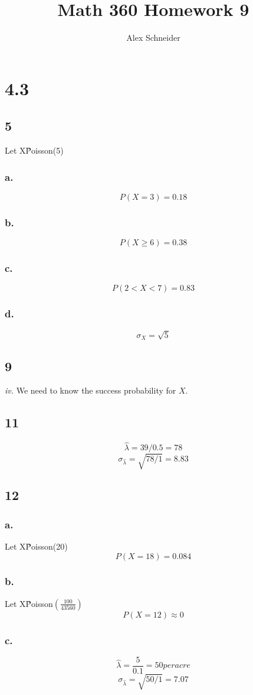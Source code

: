 \documentclass[11pt]{article}
\title{Math 360 Homework 9}
\author{Alex Schneider}
\begin{document}
\maketitle
\section{4.3}
\subsection{5}
Let X\~Poisson(5)
\subsubsection{a.}
\[ P(X = 3) = 0.18 \]
\subsubsection{b.}
\[ P(X \ge 6) = 0.38 \]
\subsubsection{c.}
\[ P(2 < X < 7) = 0.83 \]
\subsubsection{d.}
\[ \sigma_X = \sqrt{5} \]

\subsection{9}
\textit{iv.} We need to know the success probability for $X$. 
\subsection{11}
\[\hat{\lambda} = 39 / 0.5 = 78 \]
\[\sigma_{\hat{\lambda}} = \sqrt{78 / 1} = 8.83 \]
\subsection{12}
\subsubsection{a.}
Let X\~Poisson(20)
\[ P(X=18) = 0.084 \]
\subsubsection{b.}
Let X\~Poisson$\left( \frac{100}{43560} \right)$
\[ P(X=12) \approx 0 \]
\subsubsection{c.}
\[\hat{\lambda} = \frac{5}{0.1} = 50 per acre \]
\[\sigma_{\hat{\lambda}} = \sqrt{50 / 1} = 7.07 \]
\end{document}
